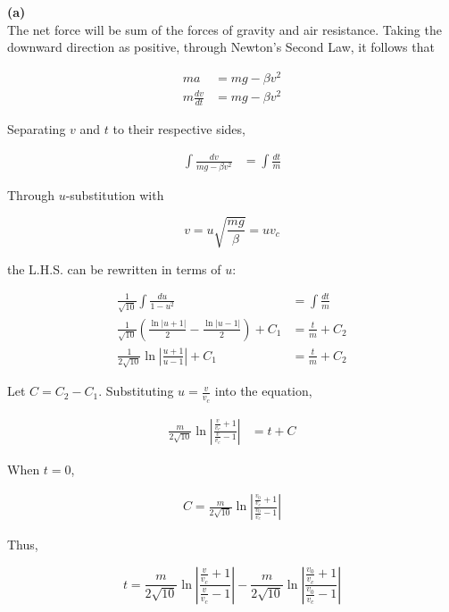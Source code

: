 \documentclass{article}
\begin{document}
    \textbf{(a)} \\
    The net force will be sum of the forces of gravity and air resistance. Taking the downward direction as positive, through Newton's Second Law, it follows that

    \begin{align*}
        ma &= mg - \beta v^2 \\
        m \frac{dv}{dt} &= mg - \beta v^2
    \end{align*}

    Separating $v$ and $t$ to their respective sides,

    \begin{align*}
        \int \frac{dv}{mg-\beta v^2}    &= \int \frac{dt}{m}
    \end{align*}

    Through $u$-substitution with

    \[
        v = u \sqrt{\frac{mg}{\beta}} = uv_c
    \]

    the L.H.S. can be rewritten in terms of $u$:

    \begin{align*}
        \frac{1}{\sqrt{10}} \int \frac{du}{1-u^2}   &= \int \frac{dt}{m} \\
        \frac{1}{\sqrt{10}}\left(\frac{\ln{|u+1|}}{2}-\frac{\ln{|u-1|}}{2}\right) + C_1 &= \frac{t}{m} + C_2 \\
        \frac{1}{2\sqrt{10}}\ln{\left|\frac{u+1}{u-1}\right|}           + C_1 &= \frac{t}{m} + C_2
    \end{align*}

    Let $C = C_2 - C_1$. Substituting $u=\frac{v}{v_c}$ into the equation,

    \begin{align*}
        \frac{m}{2\sqrt{10}} \ln{\left|\frac{\frac{v}{v_c}+1}{\frac{v}{v_c}-1}\right|}  &= t + C
    \end{align*}

    When $t=0$,

    \begin{align*}
        C = \frac{m}{2\sqrt{10}}\ln{\left|\frac{\frac{v_0}{v_c} + 1}{\frac{v_0}{v_c} - 1}\right|}
    \end{align*}

    Thus,

    \[
        t = \frac{m}{2\sqrt{10}} \ln{\left|\frac{\frac{v}{v_c}+1}{\frac{v}{v_c}-1}\right|} - \frac{m}{2\sqrt{10}}\ln{\left|\frac{\frac{v_0}{v_c} + 1}{\frac{v_0}{v_c} - 1}\right|}
    \]
\end{document}
